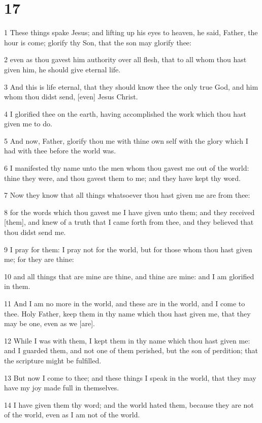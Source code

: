 \chapter{17}

\par 1 These things spake Jesus; and lifting up his eyes to heaven, he said, Father, the hour is come; glorify thy Son, that the son may glorify thee:
\par 2 even as thou gavest him authority over all flesh, that to all whom thou hast given him, he should give eternal life.
\par 3 And this is life eternal, that they should know thee the only true God, and him whom thou didst send, [even] Jesus Christ.
\par 4 I glorified thee on the earth, having accomplished the work which thou hast given me to do.
\par 5 And now, Father, glorify thou me with thine own self with the glory which I had with thee before the world was.
\par 6 I manifested thy name unto the men whom thou gavest me out of the world: thine they were, and thou gavest them to me; and they have kept thy word.
\par 7 Now they know that all things whatsoever thou hast given me are from thee:
\par 8 for the words which thou gavest me I have given unto them; and they received [them], and knew of a truth that I came forth from thee, and they believed that thou didst send me.
\par 9 I pray for them: I pray not for the world, but for those whom thou hast given me; for they are thine:
\par 10 and all things that are mine are thine, and thine are mine: and I am glorified in them.
\par 11 And I am no more in the world, and these are in the world, and I come to thee. Holy Father, keep them in thy name which thou hast given me, that they may be one, even as we [are].
\par 12 While I was with them, I kept them in thy name which thou hast given me: and I guarded them, and not one of them perished, but the son of perdition; that the scripture might be fulfilled.
\par 13 But now I come to thee; and these things I speak in the world, that they may have my joy made full in themselves.
\par 14 I have given them thy word; and the world hated them, because they are not of the world, even as I am not of the world.
